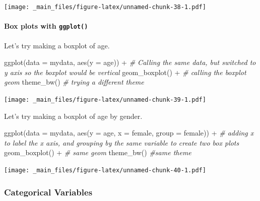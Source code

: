 \documentclass[
]{book}
\newenvironment{Shaded}{\begin{snugshade}}{\end{snugshade}}
\newcommand{\AttributeTok}[1]{\textcolor[rgb]{0.77,0.63,0.00}{#1}}
\newcommand{\CommentTok}[1]{\textcolor[rgb]{0.56,0.35,0.01}{\textit{#1}}}
\newcommand{\FunctionTok}[1]{\textcolor[rgb]{0.00,0.00,0.00}{#1}}
\newcommand{\NormalTok}[1]{#1}
\newcommand{\SpecialCharTok}[1]{\textcolor[rgb]{0.00,0.00,0.00}{#1}}
\begin{document}
\texttt{[image: \_main\_files/figure-latex/unnamed-chunk-38-1.pdf]}

\hypertarget{boxplot}{%
\paragraph*{\texorpdfstring{Box plots with \texttt{ggplot()}}{Box plots with ggplot()}}\label{boxplot}}

Let's try making a boxplot of age.

\begin{Shaded}
\begin{Highlighting}[]
\FunctionTok{ggplot}\NormalTok{(}\AttributeTok{data =}\NormalTok{ mydata, }\FunctionTok{aes}\NormalTok{(}\AttributeTok{y =}\NormalTok{ age)) }\SpecialCharTok{+} \CommentTok{\# Calling the same data, but switched to y axis so the boxplot would be vertical}
  \FunctionTok{geom\_boxplot}\NormalTok{() }\SpecialCharTok{+} \CommentTok{\# calling the boxplot geom}
  \FunctionTok{theme\_bw}\NormalTok{() }\CommentTok{\# trying a different theme}
\end{Highlighting}
\end{Shaded}

\texttt{[image: \_main\_files/figure-latex/unnamed-chunk-39-1.pdf]}

Let's try making a boxplot of age by gender.

\begin{Shaded}
\begin{Highlighting}[]
\FunctionTok{ggplot}\NormalTok{(}\AttributeTok{data =}\NormalTok{ mydata, }\FunctionTok{aes}\NormalTok{(}\AttributeTok{y =}\NormalTok{ age, }\AttributeTok{x =}\NormalTok{ female, }\AttributeTok{group =}\NormalTok{ female)) }\SpecialCharTok{+} 
  \CommentTok{\# adding x to label the x axis, and grouping by the same variable to create two box plots}
  \FunctionTok{geom\_boxplot}\NormalTok{() }\SpecialCharTok{+} \CommentTok{\# same geom}
  \FunctionTok{theme\_bw}\NormalTok{() }\CommentTok{\#same theme}
\end{Highlighting}
\end{Shaded}

\texttt{[image: \_main\_files/figure-latex/unnamed-chunk-40-1.pdf]}

\hypertarget{categorical-variables-1}{%
\subsubsection{Categorical Variables}\label{categorical-variables-1}}
\end{document}
